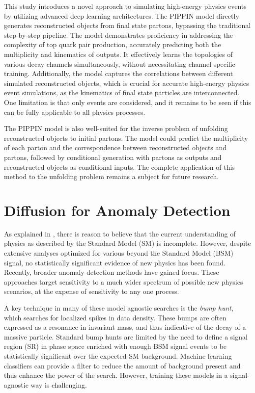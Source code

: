 This study introduces a novel approach to simulating high-energy physics events by utilizing advanced deep learning architectures.
The PIPPIN model directly generates reconstructed objects from final state partons, bypassing the traditional step-by-step pipeline.
The model demonstrates proficiency in addressing the complexity of top quark pair production, accurately predicting both the multiplicity and kinematics of outputs.
It effectively learns the topologies of various decay channels simultaneously, without necessitating channel-specific training.
Additionally, the model captures the correlations between different simulated reconstructed objects, which is crucial for accurate high-energy physics event simulations, as the kinematics of final state particles are interconnected.
One limitation is that only \ttbar events are considered, and it remains to be seen if this can be fully applicable to all physics processes.

The PIPPIN model is also well-suited for the inverse problem of unfolding reconstructed objects to initial partons.
The model could predict the multiplicity of each parton and the correspondence between reconstructed objects and partons, followed by conditional generation with partons as outputs and reconstructed objects as conditional inputs.
The complete application of this method to the unfolding problem remains a subject for future research.

\section{Diffusion for Anomaly Detection}
\label{sec:drapes}

As explained in , there is reason to believe that the current understanding of physics as described by the Standard Model (SM) is incomplete.
However, despite extensive analyses optimized for various beyond the Standard Model (BSM) signal, no statistically significant evidence of new physics has been found.
Recently, broader anomaly detection methods have gained focus.
These approaches target sensitivity to a much wider spectrum of possible new physics scenarios, at the expense of sensitivity to any one process.

A key technique in many of these model agnostic searches is the \textit{bump hunt}, which searches for localized spikes in data density.
These bumps are often expressed as a resonance in invariant mass, and thus indicative of the decay of a massive particle.
Standard bump hunts are limited by the need to define a signal region (SR) in phase space enriched with enough BSM signal events to be statistically significant over the expected SM background.
Machine learning classifiers can provide a filter to reduce the amount of background present and thus enhance the power of the search.
However, training these models in a signal-agnostic way is challenging.

